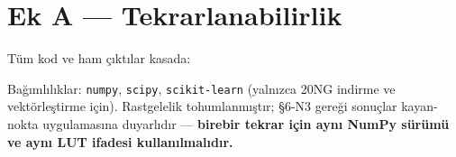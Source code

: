 \documentclass[11pt]{article}
\begin{document}
\section*{Ek A — Tekrarlanabilirlik}
Tüm kod ve ham çıktılar kasada:
\begin{center}\small{}\end{center}
Bağımlılıklar: \texttt{numpy}, \texttt{scipy}, \texttt{scikit-learn} (yalnızca 20NG indirme ve vektörleştirme için). Rastgelelik tohumlanmıştır; §6-N3 gereği sonuçlar kayan-nokta uygulamasına duyarlıdır — \textbf{birebir tekrar için aynı NumPy sürümü ve aynı LUT ifadesi kullanılmalıdır.}
\end{document}
